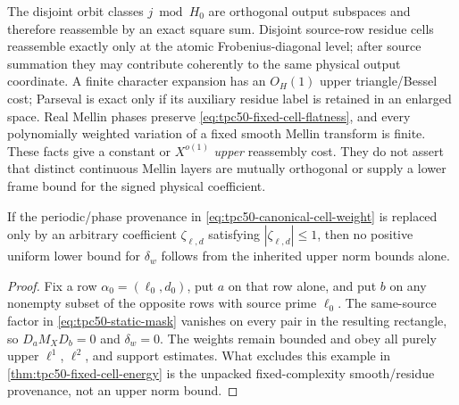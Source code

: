 The disjoint orbit classes \(j\bmod H_0\) are orthogonal output
subspaces and therefore reassemble by an exact square sum.  Disjoint
source-row residue cells reassemble exactly only at the atomic
Frobenius-diagonal level; after source summation they may contribute
coherently to the same physical output coordinate.  A finite character
expansion has an \(O_H(1)\) upper triangle/Bessel cost; Parseval is exact
only if its auxiliary residue label is retained in an enlarged space.
Real Mellin phases preserve \eqref{eq:tpc50-fixed-cell-flatness}, and
every polynomially weighted variation of a fixed smooth Mellin
transform is finite.  These facts give a constant or \(X^{o(1)}\)
\emph{upper} reassembly cost.  They do not assert that distinct
continuous Mellin layers are mutually orthogonal or supply a lower
frame bound for the signed physical coefficient.

\begin{proposition}
\label{prop:tpc50-abstract-interface-counterexample}
If the periodic/phase provenance in
\eqref{eq:tpc50-canonical-cell-weight} is replaced only by an arbitrary
coefficient \(\zeta_{\ell,d}\) satisfying
\(|\zeta_{\ell,d}|\leq1\), then no positive uniform lower bound for
\(\delta_w\) follows from the inherited upper norm bounds alone.
\end{proposition}

\begin{proof}
Fix a row \(\alpha_0=(\ell_0,d_0)\), put \(a\) on that row alone, and
put \(b\) on any nonempty subset of the opposite rows with source prime
\(\ell_0\).  The same-source factor in \eqref{eq:tpc50-static-mask}
vanishes on every pair in the resulting rectangle, so
\(D_aM_XD_b=0\) and \(\delta_w=0\).  The weights remain bounded and obey
all purely upper \(\ell^1\), \(\ell^2\), and support estimates.  What
excludes this example in
\cref{thm:tpc50-fixed-cell-energy} is the unpacked fixed-complexity
smooth/residue provenance, not an upper norm bound.
\end{proof}
